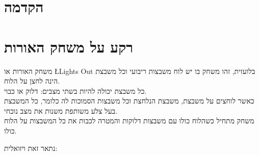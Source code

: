 \documentclass[12pt,twoside]{article}
\begin{document}
\begin{titlepage}

\vfill %

\end{titlepage}
\tableofcontents

\newpage
\section{הקדמה}

\section{רקע על משחק האורות}
משחק האורות או 
\L{Lights Out}
בלועזית,
זהו משחק בו יש לוח משבצות ריבועי
וכל משבצת הינה לחצן על הלוח.
\\
כל משבצת יכולה להיות בשתי מצבים:
דלוק או כבוי.
\\
כאשר לוחצים על משבצת, משבצת הנלחצת וכל משבצות הסמוכות לה כלומר,
כל המשבצת בעל צלע משותפת משנות את מצב נוכחי.
\\
משחק מתחיל כשהלוח כולו עם משבצות דלוקות והמטרה לכבות את כל המשבצות על הלוח כולו.

נתאר זאת ויזואלית: 
\end{document}
